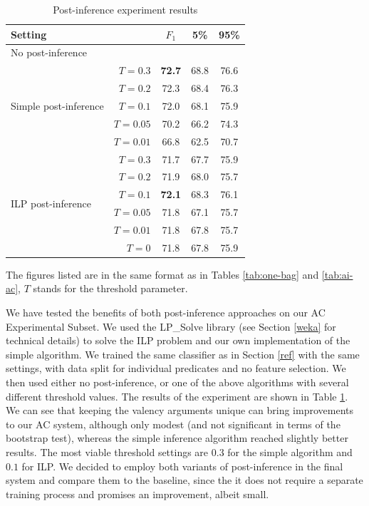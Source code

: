 \documentclass[12pt,notitlepage]{report}
\begin{document}
\begin{table}[htb]\label{tab:post-inference}
\caption{Post-inference experiment results}\footnotesize
\begin{center}
\begin{tabular}{|lr|c|c|c|}\hline
\multicolumn{2}{|l|}{\bf Setting} & $F_1$ & \bf 5\% & \bf 95\% \\\hline
\multicolumn{2}{|l|}{No post-inference} & & & \\\hline
\multirow{5}{*}{Simple post-inference} & $T = 0.3$ & \bf 72.7 & 68.8 & 76.6 \\
& $T = 0.2$ & 72.3 & 68.4 & 76.3 \\
& $T = 0.1$ & 72.0 & 68.1 & 75.9 \\
& $T = 0.05$ & 70.2 & 66.2 & 74.3 \\
& $T = 0.01$ & 66.8 & 62.5 & 70.7 \\\hline
\multirow{6}{*}{ILP post-inference} & $T = 0.3$ & 71.7 & 67.7 & 75.9 \\
& $T = 0.2$ & 71.9 & 68.0 & 75.7 \\
& $T = 0.1$ & \bf 72.1 & 68.3 & 76.1 \\
& $T = 0.05$ & 71.8 & 67.1 & 75.7 \\
& $T = 0.01$ & 71.8 & 67.8 & 75.7 \\
& $T = 0$ & 71.8 & 67.8 & 75.9 \\\hline
\end{tabular}
\end{center}
The figures listed are in the same format as in Tables \ref{tab:one-bag} and \ref{tab:ai-ac}, $T$ stands for the threshold parameter.
\end{table}

We have tested the benefits of both post-inference approaches on our AC Experimental Subset. We used the LP\_Solve library (see Section \ref{weka} for technical details) to solve the ILP problem and our own implementation of the simple algorithm. We trained the same classifier as in Section \ref{ref} with the same settings, with data split for individual predicates and no feature selection. We then used either no post-inference, or one of the above algorithms with several different threshold values. The results of the experiment are shown in Table \ref{tab:post-inference}. We can see that keeping the valency arguments unique can bring improvements to our AC system, although only modest (and not significant in terms of the bootstrap test), whereas the simple inference algorithm reached slightly better results. The most viable threshold settings are $0.3$ for the simple algorithm and $0.1$ for ILP. We decided to employ both variants of post-inference in the final system and compare them to the baseline, since the it does not require a separate training process and promises an improvement, albeit small.
\end{document}
